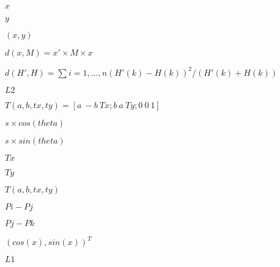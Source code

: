 \documentclass{article}
\begin{document}
$x$
\pagebreak

$y$
\pagebreak

$(x,y)$
\pagebreak

$d(x, M) = x' \times M \times x$
\pagebreak

$d(H', H) = \sum {i=1,...,n} (H'(k)-H(k))^2 / (H'(k)+H(k)) $
\pagebreak

$L2$
\pagebreak

$T(a,b,tx,ty) = [a \ -b \ Tx; b \ a \ Ty ; 0 \ 0 \ 1]$
\pagebreak

$ s \times cos(theta) $
\pagebreak

$ s \times sin(theta) $
\pagebreak

$ Tx $
\pagebreak

$ Ty $
\pagebreak

$T(a,b,tx,ty)$
\pagebreak

$Pi-Pj$
\pagebreak

$Pj-Pk$
\pagebreak

$(cos(x), sin(x))^T$
\pagebreak

$L1$
\pagebreak
\end{document}
